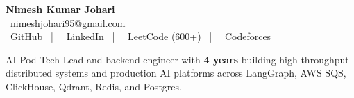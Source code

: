 \documentclass[a4paper,11pt]{article}
\begin{document}
\begin{center}
  {\LARGE \textbf{Nimesh Kumar Johari}} \\
  \faAt\ \href{mailto:nimeshjohari95@gmail.com}{nimeshjohari95@gmail.com} \\
  \faGithub\ \href{https://github.com/NimeshJohari02}{GitHub} ~|~
  \faLinkedin\ \href{https://www.linkedin.com/in/nimeshjohari02/}{LinkedIn} ~|~
  \faCode\ \href{https://leetcode.com/nimeshjohari02/}{LeetCode (600+)} ~|~
  \faCode\ \href{https://codeforces.com/profile/nimesh_02}{Codeforces}
\end{center}

\begin{center}
\small AI Pod Tech Lead and backend engineer with \textbf{4 years} building high-throughput distributed systems and production AI platforms across LangGraph, AWS SQS, ClickHouse, Qdrant, Redis, and Postgres.
\end{center}
\vspace{-10pt}
\end{document}
